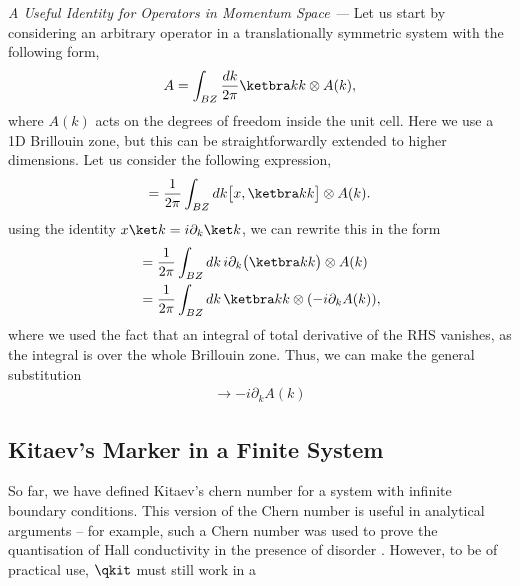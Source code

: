 \begin{shaded}
    {\it A Useful Identity for Operators in Momentum Space --- } Let us start by considering an arbitrary operator in a translationally symmetric system with the following form,
    \begin{align}
        A =  \int_{BZ} \frac{d k}{2\pi} \ketbra k k \otimes A(k),
    \end{align}
    where $A(k)$ acts on the degrees of freedom inside the unit cell. Here we use a 1D Brillouin zone, but this can be straightforwardly extended to 
    higher dimensions. Let us consider the following expression,
    \begin{align}
        [x, A] = \frac{1}{2\pi} \int_{BZ} d k \big [x,\ketbra k k \big ] \otimes A(k).
    \end{align} 
    using the identity $x\ket k = i\partial_k \ket k$, we can rewrite this in the form
    \begin{align}
        [x, A] & = \frac{1}{2\pi} \int_{BZ} d k\, i \partial_k \big(\ketbra k k \big) \otimes A(k) \\ 
        &= \frac{1}{2\pi} \int_{BZ} d k\,  \ketbra k k 
        \otimes ( -i \partial_k A(k)),
    \end{align} 
    where we used the fact that an integral of total derivative of the RHS vanishes, as the integral is over the whole Brillouin zone. Thus, we can make the general substitution
    \begin{align}
        [x,A] \rightarrow -i \partial_{k} A(k)
    \end{align}
\end{shaded}

\subsection{Kitaev's Marker in a Finite System}

So far, we have defined Kitaev's chern number for a system with infinite boundary conditions. This version of the Chern number is useful in analytical arguments -- for example, such a Chern number was used to prove the quantisation of Hall conductivity in the presence of disorder \cite{bellissard_noncommutative_1994}. However, to be of practical use, $\qkit$ must still work in a 


